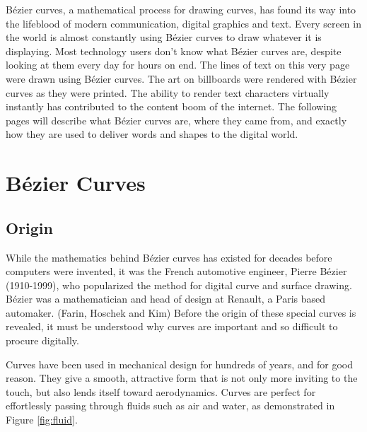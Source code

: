 \documentclass[12pt,letterpaper]{article}
\begin{document}
Bézier curves, a mathematical process for drawing curves, has found its way into the lifeblood of modern communication, digital graphics and text. Every screen in the world is almost constantly using Bézier curves to draw whatever it is displaying. Most technology users don’t know what Bézier curves are, despite looking at them every day for hours on end.  The lines of text on this very page were drawn using Bézier curves. The art on billboards were rendered with Bézier curves as they were printed. The ability to render text characters virtually instantly has contributed to the content boom of the internet. The following pages will describe what Bézier curves are, where they came from, and exactly how they are used to deliver words and shapes to the digital world.


\section{B\'ezier Curves}

\subsection{Origin}
While the mathematics behind Bézier curves has existed for decades before computers were invented, it was the French automotive engineer, Pierre Bézier (1910-1999), who popularized the method for digital curve and surface drawing. B\'ezier was a mathematician and head of design at Renault, a Paris based automaker. (Farin, Hoschek and Kim) Before the origin of these special curves is revealed, it must be understood why curves are important and so difficult to procure digitally.

Curves have been used in mechanical design for hundreds of years, and for good reason. They give a smooth, attractive form that is not only more inviting to the touch, but also lends itself toward aerodynamics. Curves are perfect for effortlessly passing through fluids such as air and water, as demonstrated in Figure \ref{fig:fluid}.
\end{document}
